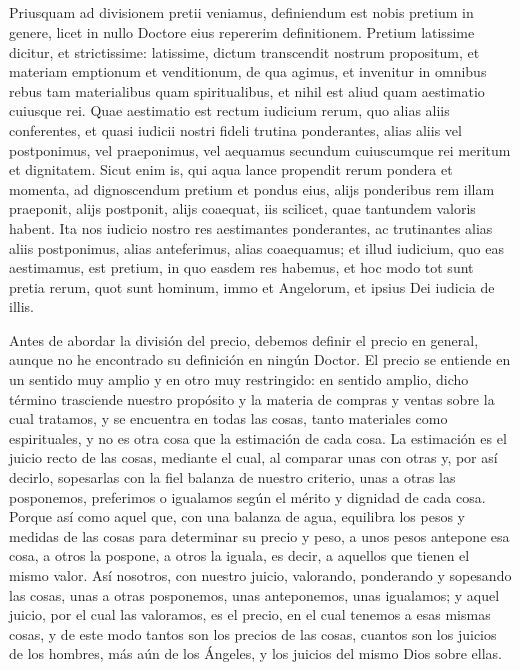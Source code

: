 \documentclass{article}
\begin{document}
\begin{paracol}{3}
\begin{nthcolumn}{2}
    \subsection*{\centering }
  \end{nthcolumn}
  \vspace{0.5cm}
  \begin{nthcolumn*}{0} %
    Priusquam ad divisionem pretii veniamus, definiendum est nobis pretium in genere, licet in nullo Doctore eius repererim definitionem. Pretium latissime dicitur, et strictissime: latissime, dictum transcendit nostrum propositum, et materiam emptionum et venditionum, de qua agimus, et invenitur in omnibus rebus tam materialibus quam spiritualibus, et nihil est aliud quam aestimatio cuiusque rei. Quae aestimatio est rectum iudicium rerum, quo alias aliis conferentes, et quasi iudicii nostri fideli trutina ponderantes, alias aliis vel postponimus, vel praeponimus, vel aequamus secundum cuiuscumque rei meritum et dignitatem. Sicut enim is, qui aqua lance propendit rerum pondera et momenta, ad dignoscendum pretium et pondus eius, alijs ponderibus rem illam praeponit, alijs postponit, alijs coaequat, iis scilicet, quae tantundem valoris habent. Ita nos iudicio nostro res aestimantes ponderantes, ac trutinantes alias aliis postponimus, alias anteferimus, alias coaequamus; et illud iudicium, quo eas aestimamus, est pretium, in quo easdem res habemus, et hoc modo tot sunt pretia rerum, quot sunt hominum, immo et Angelorum, et ipsius Dei iudicia de illis.
  \end{nthcolumn*}
  \vspace{0.5cm}
  \begin{nthcolumn}{1} %
    Antes de abordar la división del precio, debemos definir el precio en general, aunque no he encontrado su definición en ningún Doctor. El precio se entiende en un sentido muy amplio y en otro muy restringido: en sentido amplio, dicho término trasciende nuestro propósito y la materia de compras y ventas sobre la cual tratamos, y se encuentra en todas las cosas, tanto materiales como espirituales, y no es otra cosa que la estimación de cada cosa. La estimación es el juicio recto de las cosas, mediante el cual, al comparar unas con otras y, por así decirlo, sopesarlas con la fiel balanza de nuestro criterio, unas a otras las posponemos, preferimos o igualamos según el mérito y dignidad de cada cosa. Porque así como aquel que, con una balanza de agua, equilibra los pesos y medidas de las cosas para determinar su precio y peso, a unos pesos antepone esa cosa, a otros la pospone, a otros la iguala, es decir, a aquellos que tienen el mismo valor. Así nosotros, con nuestro juicio, valorando, ponderando y sopesando las cosas, unas a otras posponemos, unas anteponemos, unas igualamos; y aquel juicio, por el cual las valoramos, es el precio, en el cual tenemos a esas mismas cosas, y de este modo tantos son los precios de las cosas, cuantos son los juicios de los hombres, más aún de los Ángeles, y los juicios del mismo Dios sobre ellas.

\end{nthcolumn}
\end{paracol}
\end{document}
